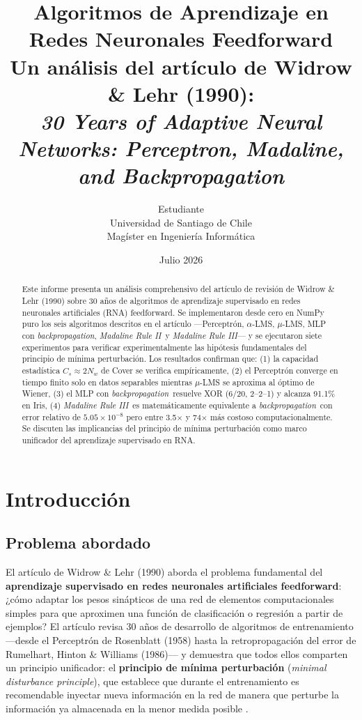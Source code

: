 \documentclass[11pt,a4paper]{article}
\title{\textbf{Algoritmos de Aprendizaje en Redes Neuronales Feedforward}\\[4pt]
\large Un análisis del artículo de Widrow \& Lehr (1990):\\
\textit{30 Years of Adaptive Neural Networks: Perceptron, Madaline, and Backpropagation}}
\author{Estudiante\\Universidad de Santiago de Chile\\Magíster en Ingeniería Informática}
\date{Julio 2026}
\newcommand{\aLMS}{$\alpha$-LMS}
\newcommand{\muLMS}{$\mu$-LMS}
\newcommand{\bp}{\textit{backpropagation}}
\newcommand{\mrii}{\textit{Madaline Rule II}}
\newcommand{\mriii}{\textit{Madaline Rule III}}
\begin{document}
\maketitle

\begin{abstract}
Este informe presenta un análisis comprehensivo del artículo de revisión de Widrow \& Lehr (1990)
sobre 30 años de algoritmos de aprendizaje supervisado en redes neuronales artificiales (RNA)
feedforward. Se implementaron desde cero en NumPy puro los seis algoritmos descritos en el artículo
—Perceptrón, \aLMS, \muLMS, MLP con \bp, \mrii~y \mriii— y se ejecutaron siete experimentos
para verificar experimentalmente las hipótesis fundamentales del principio de mínima perturbación.
Los resultados confirman que: (1) la capacidad estadística $C_s \approx 2N_w$ de Cover se verifica
empíricamente, (2) el Perceptrón converge en tiempo finito solo en datos separables mientras \muLMS
se aproxima al óptimo de Wiener, (3) el MLP con \bp~resuelve XOR (6/20, 2--2--1) y alcanza 91.1\% en
Iris, (4) \mriii~es matemáticamente equivalente a \bp~con error relativo de $5.05 \times 10^{-8}$
pero entre 3.5$\times$ y 74$\times$ más costoso computacionalmente. Se discuten las implicancias
del principio de mínima perturbación como marco unificador del aprendizaje supervisado en RNA.
\end{abstract}

\tableofcontents
\newpage

\section{Introducción}

\subsection{Problema abordado}

El artículo de Widrow \& Lehr (1990) \cite{widrow1990} aborda el problema fundamental del
\textbf{aprendizaje supervisado en redes neuronales artificiales feedforward}: ¿cómo adaptar los
pesos sinápticos de una red de elementos computacionales simples para que aproximen una función
de clasificación o regresión a partir de ejemplos? El artículo revisa 30 años de desarrollo de
algoritmos de entrenamiento —desde el Perceptrón de Rosenblatt (1958) hasta la retropropagación
del error de Rumelhart, Hinton \& Williams (1986)— y demuestra que todos ellos comparten un
principio unificador: el \textbf{principio de mínima perturbación} (\textit{minimal disturbance
principle}), que establece que durante el entrenamiento es recomendable inyectar nueva información
en la red de manera que perturbe la información ya almacenada en la menor medida posible
\cite{widrow1990}.
\end{document}
